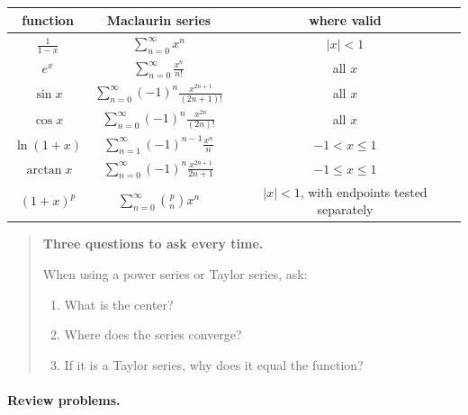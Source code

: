 \begin{center}
\renewcommand{\arraystretch}{1.7}
\begin{tabular}{c|c|c}
\textbf{function} & \textbf{Maclaurin series} & \textbf{where valid} \\ \hline
\(\displaystyle \frac1{1-x}\) &
\(\displaystyle \sum_{n=0}^{\infty}x^n\) &
\(|x|<1\) \\

\(e^x\) &
\(\displaystyle \sum_{n=0}^{\infty}\frac{x^n}{n!}\) &
all \(x\) \\

\(\sin x\) &
\(\displaystyle \sum_{n=0}^{\infty}(-1)^n\frac{x^{2n+1}}{(2n+1)!}\) &
all \(x\) \\

\(\cos x\) &
\(\displaystyle \sum_{n=0}^{\infty}(-1)^n\frac{x^{2n}}{(2n)!}\) &
all \(x\) \\

\(\ln(1+x)\) &
\(\displaystyle \sum_{n=1}^{\infty}(-1)^{n-1}\frac{x^n}{n}\) &
\(-1<x\le1\) \\

\(\arctan x\) &
\(\displaystyle \sum_{n=0}^{\infty}(-1)^n\frac{x^{2n+1}}{2n+1}\) &
\(-1\le x\le1\) \\

\((1+x)^p\) &
\(\displaystyle \sum_{n=0}^{\infty}\binom{p}{n}x^n\) &
\(|x|<1\), with endpoints tested separately
\end{tabular}
\end{center}

\begin{quote}
\textbf{Three questions to ask every time.}

When using a power series or Taylor series, ask:

\begin{enumerate}
\item What is the center?

\item Where does the series converge?

\item If it is a Taylor series, why does it equal the function?
\end{enumerate}
\end{quote}

\paragraph{Review problems.}

